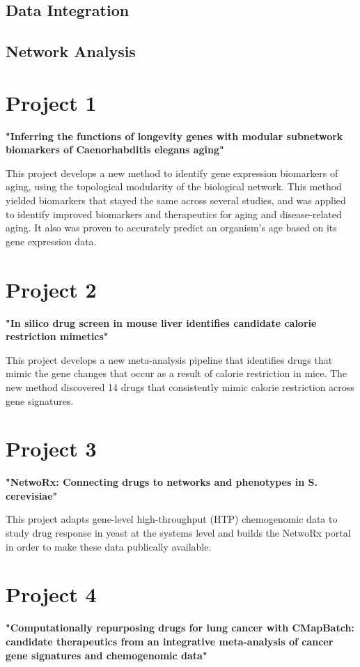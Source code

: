 \documentclass{sig-alternate-05-2015}
\begin{document}
\subsection{Data Integration}

\subsection{Network Analysis}

\section{Project 1}
\textbf{"Inferring the functions of longevity genes with modular subnetwork biomarkers of Caenorhabditis elegans aging"}
\vspace{5mm}

This project develops a new method to identify gene expression biomarkers of
aging, using the topological modularity of the biological network. This method
yielded biomarkers that stayed the same across several studies, and was applied
to identify improved biomarkers and therapeutics for aging and disease-related
aging. It also was proven to accurately predict an organism's age based on its
gene expression data.

\section{Project 2}
\textbf{"In silico drug screen in mouse liver identifies candidate calorie restriction mimetics"}
\vspace{5mm}

This project develops a new meta-analysis pipeline that identifies drugs that
mimic the gene changes that occur as a result of calorie restriction in mice.
The new method discovered 14 drugs that consistently mimic calorie restriction
across gene signatures.

\section{Project 3}
\textbf{"NetwoRx: Connecting drugs to networks and phenotypes in S. cerevisiae"}
\vspace{5mm}

This project adapts gene-level high-throughput (HTP) chemogenomic data to study
drug response in yeast at the systems level and builds the NetwoRx portal in
order to make these data publically available.

\section{Project 4}
\textbf{"Computationally repurposing drugs for lung cancer with CMapBatch: candidate therapeutics from an integrative meta-analysis of cancer gene signatures and chemogenomic data"}
\vspace{5mm}
\end{document}

